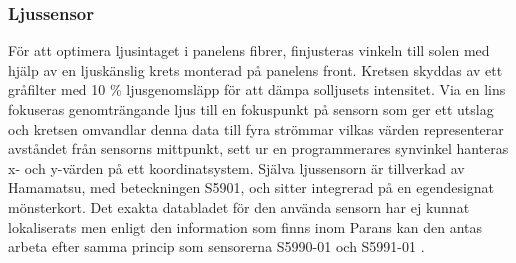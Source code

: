         \subsubsection{Ljussensor} %
        \label{ssub:ljussensor}
            För att optimera ljusintaget i panelens fibrer, finjusteras vinkeln till solen med hjälp av en ljuskänslig krets monterad på panelens front. Kretsen skyddas av ett gråfilter med 10 \% ljusgenomsläpp för att dämpa solljusets intensitet. Via en lins fokuseras genomträngande ljus till en fokuspunkt på sensorn som ger ett utslag och kretsen omvandlar denna data till fyra strömmar vilkas värden representerar avståndet från sensorns mittpunkt, sett ur en programmerares synvinkel hanteras x- och y-värden på ett koordinatsystem. Själva ljussensorn är tillverkad av Hamamatsu, med beteckningen S5901, och sitter integrerad på en egendesignat mönsterkort. Det exakta databladet för den använda sensorn har ej kunnat lokaliserats men enligt den information som finns inom Parans kan den antas arbeta efter samma princip som sensorerna S5990-01 och S5991-01 \cite{hama}.
